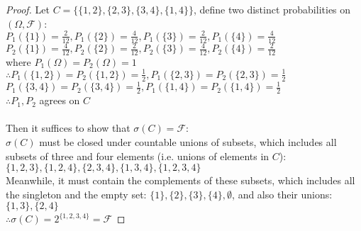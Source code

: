 \documentclass[12pt]{article}
\newenvironment{problem}[2][Problem]{\begin{trivlist}
\item[\hskip \labelsep {\bfseries #1}\hskip \labelsep {\bfseries #2.}]}{\end{trivlist}}
\begin{document}
\begin{problem}{3(a)}
\end{problem}
\begin{proof}
Let $C = \{ \{1,2\}, \{2,3\}, \{3,4\}, \{1,4\} \}$, define two distinct probabilities on $(\Omega, \mathcal{F})$:\\
$P_{1}(\{1\}) = \frac{2}{12}, P_{1}(\{2\}) = \frac{4}{12}, P_{1}(\{3\}) = \frac{2}{12}, P_{1}(\{4\}) = \frac{4}{12}$\\
$P_{2}(\{1\}) = \frac{4}{12}, P_{2}(\{2\}) = \frac{2}{12}, P_{2}(\{3\}) = \frac{4}{12}, P_{2}(\{4\}) = \frac{2}{12}$\\
where $P_{1}(\Omega) = P_{2}(\Omega) = 1$\\
$\therefore P_{1}(\{1,2\}) = P_{2}(\{1,2\}) = \frac{1}{2}, P_{1}(\{2,3\}) =P_{2}(\{2,3\}) = \frac{1}{2}$\\
$P_{1}(\{3,4\}) =P_{2}(\{3,4\}) = \frac{1}{2}, P_{1}(\{1,4\}) =P_{2}(\{1,4\}) = \frac{1}{2}$\\
$\therefore P_{1}, P_{2}$ agrees on $C$\\
\\
Then it suffices to show that $\sigma(C) = \mathcal{F}$:\\
$\sigma(C)$ must be closed under countable unions of subsets, which includes all subsets of three and four elements (i.e. unions of elements in $C$): $\{1,2,3\}, \{1,2,4\}, \{2,3,4\}, \{1,3,4\}, \{1,2,3,4\}$\\
Meanwhile, it must contain the complements of these subsets, which includes all the singleton and the empty set: $\{1\}, \{2\}, \{3\}, \{4\}, \emptyset$, and also their unions: $\{1,3\} , \{2,4\}$\\
$\therefore \sigma(C) = 2^{\{1,2,3,4\}} = \mathcal{F}$
\end{proof}
\end{document}
